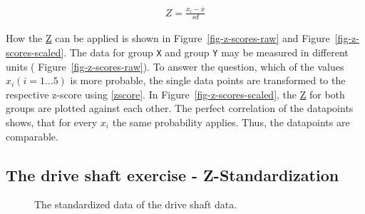 \documentclass[
  a4paper,
]{scrbook}
\begin{document}
\begin{align}
Z = \frac{x_i - \bar{x}}{sd} \label{zscore}
\end{align}

How the \hyperref[acronyms_Z]{Z} can be applied is shown in
Figure~\ref{fig-z-scores-raw} and Figure~\ref{fig-z-scores-scaled}. The
data for group \texttt{X} and group \texttt{Y} may be measured in
different units ( Figure~\ref{fig-z-scores-raw}). To answer the
question, which of the values \(x_i (i=1\ldots5)\) is more probable, the
single data points are transformed to the respective z-score using
\eqref{zscore}. In Figure~\ref{fig-z-scores-scaled}, the
\hyperref[acronyms_Z]{Z} for both groups are plotted against each other.
The perfect correlation of the datapoints shows, that for every \(x_i\)
the same probability applies. Thus, the datapoints are comparable.

\subsection{The drive shaft exercise -
Z-Standardization}\label{the-drive-shaft-exercise---z-standardization}

\begin{figure}[H]


\caption{\label{fig-ds-z}The standardized data of the drive shaft data.}

\end{figure}%
\end{document}
